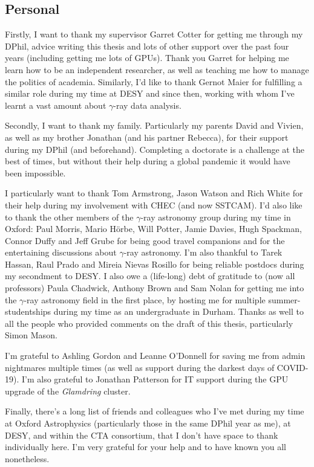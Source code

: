 \subsection*{Personal}

Firstly, I want to thank my supervisor Garret Cotter for getting me through my DPhil, advice writing this thesis and lots of other support over the past four years (including getting me lots of GPUs). Thank you Garret for helping me learn how to be an independent researcher, as well as teaching me how to manage the politics of academia. Similarly, I'd like to thank Gernot Maier for fulfilling a similar role during my time at DESY and since then, working with whom I've learnt a vast amount about $\gamma$-ray data analysis.

Secondly, I want to thank my family. Particularly my parents David and Vivien, as well as my brother Jonathan (and his partner Rebecca), for their support during my DPhil (and beforehand). Completing a doctorate is a challenge at the best of times, but without their help during a global pandemic it would have been impossible.

I particularly want to thank Tom Armstrong, Jason Watson and Rich White for their help during my involvement with CHEC (and now SSTCAM). I'd also like to thank the other members of the $\gamma$-ray astronomy group during my time in Oxford: Paul Morris, Mario H\"{o}rbe, Will Potter, Jamie Davies, Hugh Spackman, Connor Duffy and Jeff Grube for being good travel companions and for the entertaining discussions about $\gamma$-ray astronomy. I’m also thankful to Tarek Hassan, Raul Prado and Mireia Nievas Rosillo for being reliable postdocs during my secondment to DESY. I also owe a (life-long) debt of gratitude to (now all professors) Paula Chadwick, Anthony Brown and Sam Nolan for getting me into the $\gamma$-ray astronomy field in the first place, by hosting me for multiple summer-studentships during my time as an undergraduate in Durham. Thanks as well to all the people who provided comments on the draft of this thesis, particularly Simon Mason.

I’m grateful to Ashling Gordon and Leanne O’Donnell for saving me from admin nightmares multiple times (as well as support during the darkest days of COVID-19). I'm also grateful to Jonathan Patterson for IT support during the GPU upgrade of the \textit{Glamdring} cluster. 

Finally, there’s a long list of friends and colleagues who I’ve met during my time at Oxford Astrophysics (particularly those in the same DPhil year as me), at DESY, and within the CTA consortium, that I don’t have space to thank individually here. I’m very grateful for your help and to have known you all nonetheless.

